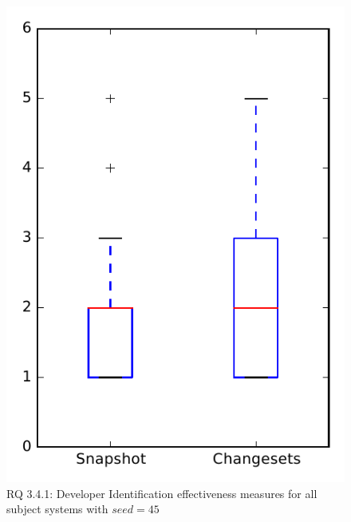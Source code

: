 
\begin{figure}
\centering
\includegraphics[height=0.4\textheight]{figures/dit_seed/rq1_overview_45}
\caption{RQ 3.4.1: Developer Identification effectiveness measures for all subject systems with $seed=45$}
\label{fig:dit_seed:rq1:overview}
\end{figure}
